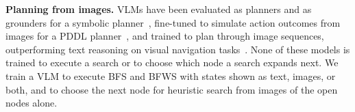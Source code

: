 
\textbf{Planning from images.} VLMs have been evaluated as planners and as grounders for a symbolic planner~\citep{merler2025viplan}, fine-tuned to simulate action outcomes from images for a PDDL planner~\citep{hao2025simulation}, and trained to plan through image sequences, outperforming text reasoning on visual navigation tasks~\citep{xu2025visual}. None of these models is trained to execute a search or to choose which node a search expands next. We train a VLM to execute BFS and BFWS with states shown as text, images, or both, and to choose the next node for heuristic search from images of the open nodes alone.

